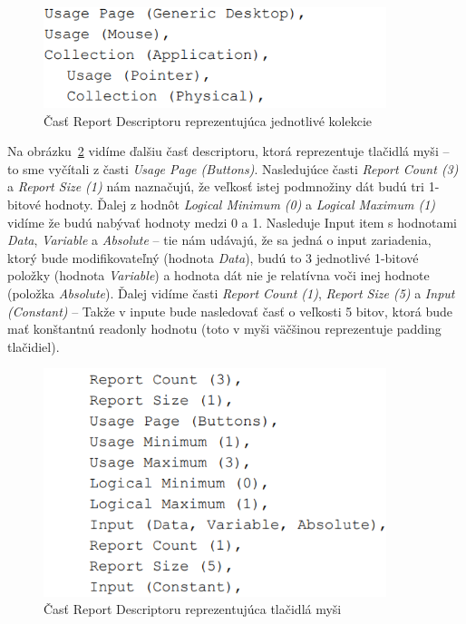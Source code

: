 \begin{figure}[!htb]
	\centering
	\includegraphics[width=10cm]{img/kap03_report_desc_collection}
	\caption{Časť Report Descriptoru reprezentujúca jednotlivé kolekcie}
	\label{obr:kap3:report_desc_collection}
\end{figure}

Na obrázku~\ref{obr:kap3:report_desc_buttons} vidíme ďalšiu časť descriptoru, ktorá reprezentuje tlačidlá myši -- to sme vyčítali z časti \textit{Usage Page (Buttons)}. Nasledujúce časti \textit{Report Count (3)} a \textit{Report Size (1)} nám naznačujú, že veľkosť istej podmnožiny dát budú tri 1-bitové hodnoty. Ďalej z hodnôt \textit{Logical Minimum (0)} a \textit{Logical Maximum (1)} vidíme že budú nabývať hodnoty medzi 0 a 1. Nasleduje Input item s hodnotami \textit{Data}, \textit{Variable} a \textit{Absolute} -- tie nám udávajú, že sa jedná o input zariadenia, ktorý bude modifikovateľný (hodnota \textit{Data}), budú to 3 jednotlivé 1-bitové položky (hodnota \textit{Variable}) a hodnota dát nie je relatívna voči inej hodnote (položka \textit{Absolute}). Ďalej vidíme časti \textit{Report Count (1)}, \textit{Report Size (5)} a \textit{Input (Constant)} -- Takže v inpute bude nasledovať časť o veľkosti 5 bitov, ktorá bude mať konštantnú readonly hodnotu (toto v myši väčšinou reprezentuje padding tlačidiel).

\begin{figure}[!htb]
	\centering
	\includegraphics[width=10cm]{img/kap03_report_desc_buttons}
	\caption{Časť Report Descriptoru reprezentujúca tlačidlá myši}
	\label{obr:kap3:report_desc_buttons}
\end{figure}

